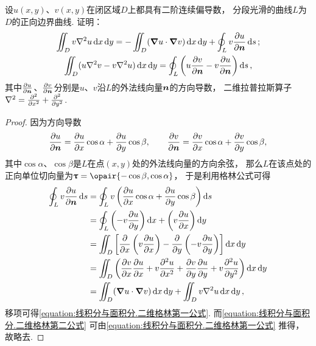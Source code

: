\begin{example}
设\(u(x,y)\)、\(v(x,y)\)在闭区域\(D\)上都具有二阶连续偏导数，
分段光滑的曲线\(L\)为\(D\)的正向边界曲线.
证明：\begin{gather}
	\iint_D v \laplacian{u} \dd{x}\dd{y}
	= - \iint_D (\grad u \cdot \grad v) \dd{x}\dd{y} + \oint_L v \pdv{u}{\vb{n}} \dd{s};
	\label{equation:线积分与面积分.二维格林第一公式} \\
	\iint_D (u \laplacian v - v \laplacian u) \dd{x}\dd{y}
	= \oint_L \left( u \pdv{v}{\vb{n}} - v \pdv{u}{\vb{n}} \right) \dd{s},
	\label{equation:线积分与面积分.二维格林第二公式}
\end{gather}
其中\(\pdv{u}{\boldsymbol{n}}\)、\(\pdv{v}{\boldsymbol{n}}\)分别是\(u\)、\(v\)沿\(L\)的外法线向量\(\boldsymbol{n}\)的方向导数，
二维拉普拉斯算子\(\laplacian = \pdv[2]{x} + \pdv[2]{y}\).
\begin{proof}
因为方向导数\[
\pdv{u}{\boldsymbol{n}}
= \pdv{u}{x} \cos\alpha
+ \pdv{u}{y} \cos\beta,
\qquad
\pdv{v}{\boldsymbol{n}}
= \pdv{v}{x} \cos\alpha
+ \pdv{v}{y} \cos\beta,
\]其中\(\cos\alpha\)、\(\cos\beta\)是\(L\)在点\((x,y)\)处的外法线向量的方向余弦，
那么\(L\)在该点处的正向单位切向量为\(\vb{\tau} = \opair{-\cos\beta,\cos\alpha}\)，
于是利用格林公式可得\begin{align*}
\oint_L v \pdv{u}{\vb{n}} \dd{s}
&= \oint_L v \left(
\pdv{u}{x} \cos\alpha
+ \pdv{u}{y} \cos\beta
\right) \dd{s} \\
&= \oint_L \left( - v \pdv{u}{y} \right) \dd{x}
	+ \left( v \pdv{u}{x} \right) \dd{y} \\
&= \iint_D \left[
	\pdv{x} \left( v \pdv{u}{x} \right)
	- \pdv{y} \left( - v \pdv{u}{y} \right)
	\right] \dd{x}\dd{y} \\
&= \iint_D \left(
	\pdv{v}{x} \pdv{u}{x}
	+ v \pdv[2]{u}{x}
	+ \pdv{v}{y} \pdv{u}{y}
	+ v \pdv[2]{u}{y}
	\right) \dd{x}\dd{y} \\
&= \iint_D (\grad u \cdot \grad v) \dd{x}\dd{y}
	+ \iint_D v \laplacian{u} \dd{x}\dd{y},
\end{align*}
移项可得\cref{equation:线积分与面积分.二维格林第一公式}.
而\cref{equation:线积分与面积分.二维格林第二公式} 可由\cref{equation:线积分与面积分.二维格林第一公式} 推得，
故略去.
\end{proof}
\end{example}

